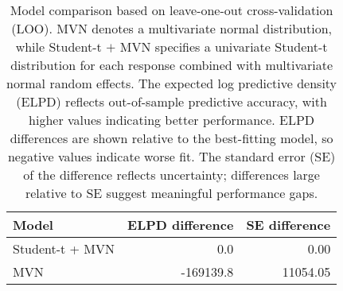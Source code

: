 \begin{table}

\caption{Model comparison based on leave-one-out cross-validation (LOO).  MVN denotes a multivariate normal distribution, while Student-t $+$ MVN specifies a univariate Student-t distribution for each response combined with multivariate normal random effects.
  The expected log predictive density (ELPD) reflects out-of-sample predictive accuracy, with higher values indicating better performance. ELPD differences are shown relative to the best-fitting model, so negative values indicate worse fit. The standard error (SE) of the difference reflects uncertainty; differences large relative to SE suggest meaningful performance gaps.}
\centering
\begin{tabular}[t]{lrr}
\toprule
Model & ELPD difference & SE difference\\
\midrule
Student-t + MVN & 0.0 & 0.00\\
MVN & -169139.8 & 11054.05\\
\bottomrule
\end{tabular}
\end{table}
